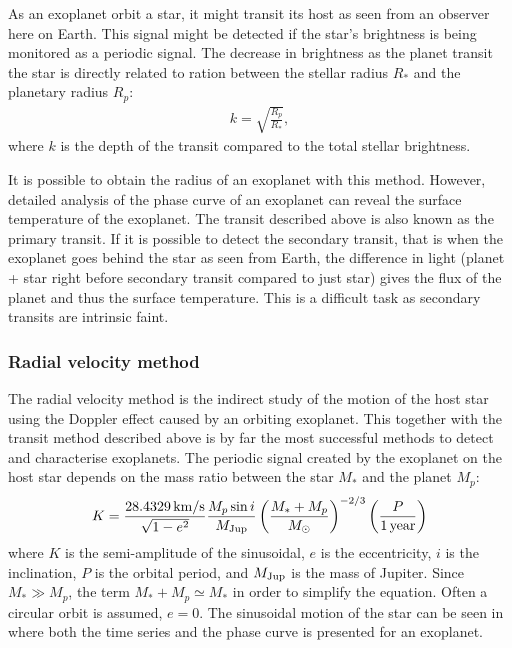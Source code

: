 As an exoplanet orbit a star, it might transit its host as seen from an observer here on Earth. This
signal might be detected if the star's brightness is being monitored as a periodic signal. The
decrease in brightness as the planet transit the star is directly related to ration between the
stellar radius $R_\ast$ and the planetary radius $R_p$:
\begin{align}
  k = \sqrt{\frac{R_p}{R_\ast}},
\end{align}
where $k$ is the depth of the transit compared to the total stellar brightness.

It is possible to obtain the radius of an exoplanet with this method. However, detailed analysis of
the phase curve of an exoplanet can reveal the surface temperature of the exoplanet. The transit
described above is also known as the primary transit. If it is possible to detect the secondary
transit, that is when the exoplanet goes behind the star as seen from Earth, the difference in light
(planet + star right before secondary transit compared to just star) gives the flux of the planet
and thus the surface temperature. This is a difficult task as secondary transits are intrinsic
faint.


\subsubsection{Radial velocity method}
\label{sec:rvmethod}

The radial velocity method is the indirect study of the motion of the host star using the Doppler
effect caused by an orbiting exoplanet. This together with the transit method described above is by
far the most successful methods to detect and characterise exoplanets. The periodic signal created
by the exoplanet on the host star depends on the mass ratio between the star $M_\ast$ and the planet
$M_p$:
\begin{align}
  K = \frac{\SI{28.4329}{km/s}}{\sqrt{1-e^2}} \frac{M_p\sin i}{M_\mathrm{Jup}} \left( \frac{M_\ast+M_p}{M_\odot} \right)^{-2/3} \left(\frac{P}{\SI{1}{year}}\right)
\end{align}
where $K$ is the semi-amplitude of the sinusoidal, $e$ is the eccentricity, $i$ is the inclination,
$P$ is the orbital period, and $M_\mathrm{Jup}$ is the mass of Jupiter. Since $M_\ast \gg M_p$, the term
$M_\ast+M_p\simeq M_\ast$ in order to simplify the equation. Often a circular orbit is assumed,
$e=0$. The sinusoidal motion of the star can be seen in  where both the time
series and the phase curve is presented for an exoplanet.

